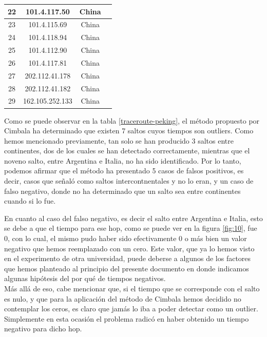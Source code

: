 \begin{table}[!htbp]
\begin{tabular}{|c|c|c|c|}
22           & 101.4.117.50                   & China            &                   \\ \hline
23           & 101.4.115.69                   & China            &                   \\ \hline
24           & 101.4.118.94                   & China            &                   \\ \hline
25           & 101.4.112.90                   & China            &                   \\ \hline
26           & 101.4.117.81                   & China            &                   \\ \hline
27           & 202.112.41.178                 & China            &                   \\ \hline
28           & 202.112.41.182                 & China            &                   \\ \hline
29           & 162.105.252.133                & China            &                   \\ \hline
\end{tabular}
\end{table}


Como se puede observar en la tabla \ref{traceroute-peking}, el método propuesto por Cimbala ha determinado que existen 7 saltos cuyos tiempos son outliers. Como hemos mencionado previamente, tan solo se han producido 3 saltos entre continentes, dos de los cuales se han detectado correctamente, mientras que el noveno salto, entre Argentina e Italia, no ha sido identificado. Por lo tanto, podemos afirmar que el método ha presentado 5 casos de falsos positivos, es decir, casos que señaló como saltos intercontnentales y no lo eran, y un caso de falso negativo, donde no ha determinado que un salto sea entre continentes cuando si lo fue.

En cuanto al caso del falso negativo, es decir el salto entre Argentina e Italia, esto se debe a que el tiempo para ese hop, como se puede ver en la figura \ref{fig:10}, fue 0, con lo cual, el mismo pudo haber sido efectivamente 0 o más bien un valor negativo que hemos reemplazado con un cero. Este valor, que ya lo hemos visto en el experimento de otra universidad, puede deberse a algunos de los factores que hemos planteado al principio del presente documento en donde indicamos algunas hipótesis del por qué de tiempos negativos. \\
Más allá de eso, cabe mencionar que, si el tiempo que se corresponde con el salto es nulo, y que para la aplicación del método de Cimbala hemos decidido no contemplar los ceros, es claro que jamás lo iba a poder detectar como un outlier. Simplemente en esta ocasión el problema radicó en haber obtenido un tiempo negativo para dicho hop.

